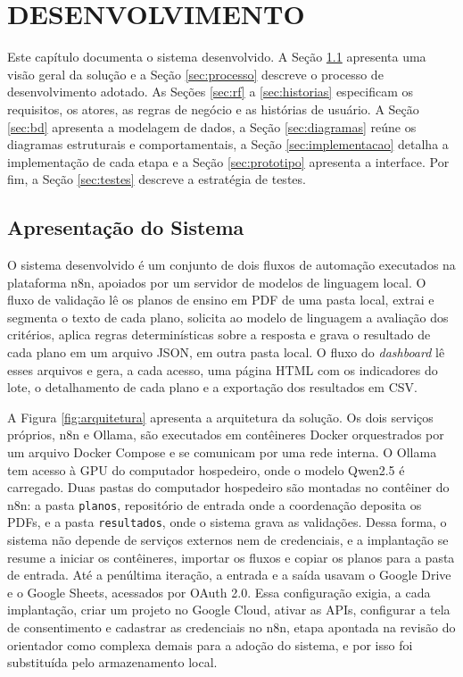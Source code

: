 \chapter{DESENVOLVIMENTO}
\label{cap:desenvolvimento}

Este capítulo documenta o sistema desenvolvido. A Seção \ref{sec:apresentacao} apresenta uma visão geral da solução e a Seção \ref{sec:processo} descreve o processo de desenvolvimento adotado. As Seções \ref{sec:rf} a \ref{sec:historias} especificam os requisitos, os atores, as regras de negócio e as histórias de usuário. A Seção \ref{sec:bd} apresenta a modelagem de dados, a Seção \ref{sec:diagramas} reúne os diagramas estruturais e comportamentais, a Seção \ref{sec:implementacao} detalha a implementação de cada etapa e a Seção \ref{sec:prototipo} apresenta a interface. Por fim, a Seção \ref{sec:testes} descreve a estratégia de testes.

\section{Apresentação do Sistema}
\label{sec:apresentacao}

O sistema desenvolvido é um conjunto de dois fluxos de automação executados na plataforma n8n, apoiados por um servidor de modelos de linguagem local. O fluxo de validação lê os planos de ensino em PDF de uma pasta local, extrai e segmenta o texto de cada plano, solicita ao modelo de linguagem a avaliação dos critérios, aplica regras determinísticas sobre a resposta e grava o resultado de cada plano em um arquivo JSON, em outra pasta local. O fluxo do \textit{dashboard} lê esses arquivos e gera, a cada acesso, uma página HTML com os indicadores do lote, o detalhamento de cada plano e a exportação dos resultados em CSV.

A Figura \ref{fig:arquitetura} apresenta a arquitetura da solução. Os dois serviços próprios, n8n e Ollama, são executados em contêineres Docker orquestrados por um arquivo Docker Compose e se comunicam por uma rede interna. O Ollama tem acesso à GPU do computador hospedeiro, onde o modelo Qwen2.5 é carregado. Duas pastas do computador hospedeiro são montadas no contêiner do n8n: a pasta \texttt{planos}, repositório de entrada onde a coordenação deposita os PDFs, e a pasta \texttt{resultados}, onde o sistema grava as validações. Dessa forma, o sistema não depende de serviços externos nem de credenciais, e a implantação se resume a iniciar os contêineres, importar os fluxos e copiar os planos para a pasta de entrada. Até a penúltima iteração, a entrada e a saída usavam o Google Drive e o Google Sheets, acessados por OAuth 2.0. Essa configuração exigia, a cada implantação, criar um projeto no Google Cloud, ativar as APIs, configurar a tela de consentimento e cadastrar as credenciais no n8n, etapa apontada na revisão do orientador como complexa demais para a adoção do sistema, e por isso foi substituída pelo armazenamento local.

